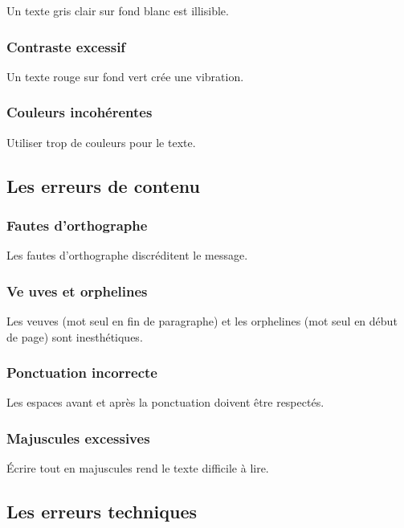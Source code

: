 Un texte gris clair sur fond blanc est illisible.

\subsubsection{Contraste excessif}

Un texte rouge sur fond vert crée une vibration.

\subsubsection{Couleurs incohérentes}

Utiliser trop de couleurs pour le texte.

\subsection{Les erreurs de contenu}

\subsubsection{Fautes d'orthographe}

Les fautes d'orthographe discréditent le message.

\subsubsection{Ve uves et orphelines}

Les veuves (mot seul en fin de paragraphe) et les orphelines (mot seul en début de page) sont inesthétiques.

\subsubsection{Ponctuation incorrecte}

Les espaces avant et après la ponctuation doivent être respectés.

\subsubsection{Majuscules excessives}

Écrire tout en majuscules rend le texte difficile à lire.

\subsection{Les erreurs techniques}

